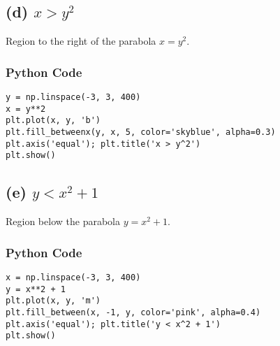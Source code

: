 \documentclass[10pt,twocolumn]{article}
\begin{document}
\subsection*{(d) $x>y^{2}$}
Region to the right of the parabola $x = y^{2}$.

\begin{center}
\end{center}

\subsubsection*{Python Code}
\begin{verbatim}
y = np.linspace(-3, 3, 400)
x = y**2
plt.plot(x, y, 'b')
plt.fill_betweenx(y, x, 5, color='skyblue', alpha=0.3)
plt.axis('equal'); plt.title('x > y^2')
plt.show()
\end{verbatim}

\subsection*{(e) $y < x^{2}+1$}
Region below the parabola $y = x^{2}+1$.

\begin{center}
\end{center}

\subsubsection*{Python Code}
\begin{verbatim}
x = np.linspace(-3, 3, 400)
y = x**2 + 1
plt.plot(x, y, 'm')
plt.fill_between(x, -1, y, color='pink', alpha=0.4)
plt.axis('equal'); plt.title('y < x^2 + 1')
plt.show()
\end{verbatim}
\end{document}
